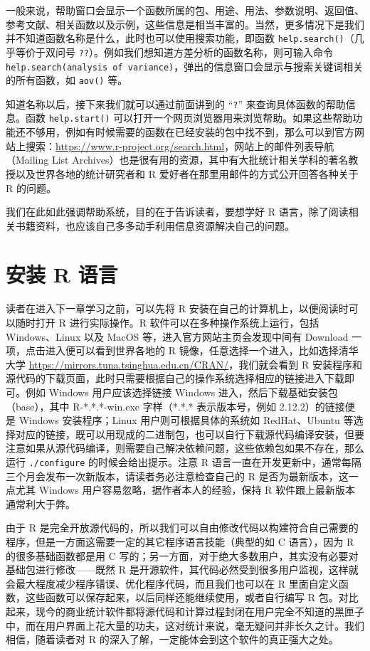 \documentclass[
  b5paper,
  UTF8,twoside]{book}
\begin{document}
一般来说，帮助窗口会显示一个函数所属的包、用途、用法、参数说明、返回值、参考文献、相关函数以及示例，这些信息是相当丰富的。当然，更多情况下是我们并不知道函数名称是什么，此时也可以使用搜索功能，即函数 \texttt{help.search()}（几乎等价于双问号 \texttt{??}）。例如我们想知道方差分析的函数名称，则可输入命令 \texttt{help.search(\textquotesingle{}analysis\ of\ variance\textquotesingle{})}，弹出的信息窗口会显示与搜索关键词相关的所有函数，如 \texttt{aov()} 等。

知道名称以后，接下来我们就可以通过前面讲到的 ``\texttt{?}'' 来查询具体函数的帮助信息。函数 \texttt{help.start()} 可以打开一个网页浏览器用来浏览帮助。如果这些帮助功能还不够用，例如有时候需要的函数在已经安装的包中找不到，那么可以到官方网站上搜索：\url{https://www.r-project.org/search.html}，网站上的邮件列表导航（Mailing List Archives）也是很有用的资源，其中有大批统计相关学科的著名教授以及世界各地的统计研究者和 R 爱好者在那里用邮件的方式公开回答各种关于 R 的问题。

我们在此如此强调帮助系统，目的在于告诉读者，要想学好 R 语言，除了阅读相关书籍资料，也应该自己多多动手利用信息资源解决自己的问题。

\hypertarget{ux5b89ux88c5-r-ux8bedux8a00}{%
\section{安装 R 语言}\label{ux5b89ux88c5-r-ux8bedux8a00}}

读者在进入下一章学习之前，可以先将 R 安装在自己的计算机上，以便阅读时可以随时打开 R 进行实际操作。R 软件可以在多种操作系统上运行，包括 Windows、Linux 以及 MacOS 等，进入官方网站主页会发现中间有 Download 一项，点击进入便可以看到世界各地的 R 镜像，任意选择一个进入，比如选择清华大学 \url{https://mirrors.tuna.tsinghua.edu.cn/CRAN/}，我们就会看到 R 安装程序和源代码的下载页面，此时只需要根据自己的操作系统选择相应的链接进入下载即可。例如 Windows 用户应该选择链接 Windows 进入，然后下载基础安装包（base），其中 R-*.*.*-win.exe 字样（*.*.* 表示版本号，例如 2.12.2）的链接便是 Windows 安装程序；Linux 用户则可根据具体的系统如 RedHat、Ubuntu 等选择对应的链接，既可以用现成的二进制包，也可以自行下载源代码编译安装，但要注意如果从源代码编译，则需要自己解决依赖问题，这些依赖包如果不存在，那么运行 \texttt{./configure} 的时候会给出提示。注意 R 语言一直在开发更新中，通常每隔三个月会发布一次新版本，请读者务必注意检查自己的 R 是否为最新版本，这一点尤其 Windows 用户容易忽略，据作者本人的经验，保持 R 软件跟上最新版本通常利大于弊。

由于 R 是完全开放源代码的，所以我们可以自由修改代码以构建符合自己需要的程序，但是一方面这需要一定的其它程序语言技能（典型的如 C 语言），因为 R 的很多基础函数都是用 C 写的；另一方面，对于绝大多数用户，其实没有必要对基础包进行修改------既然 R 是开源软件，其代码必然受到很多用户监视，这样就会最大程度减少程序错误、优化程序代码，而且我们也可以在 R 里面自定义函数，这些函数可以保存起来，以后同样还能继续使用，或者自行编写 R 包。对比起来，现今的商业统计软件都将源代码和计算过程封闭在用户完全不知道的黑匣子中，而在用户界面上花大量的功夫，这对统计来说，毫无疑问并非长久之计。我们相信，随着读者对 R 的深入了解，一定能体会到这个软件的真正强大之处。
\end{document}

